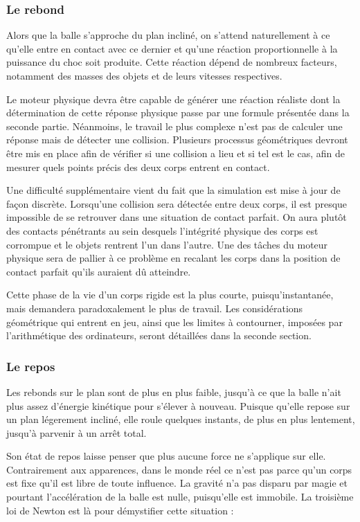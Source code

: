 \subsubsection{Le rebond}

Alors que la balle s'approche du plan incliné, on s'attend naturellement à ce qu'elle entre en contact avec ce dernier et qu'une réaction proportionnelle à la puissance du choc soit produite. Cette réaction dépend de nombreux facteurs, notamment des masses des objets et de leurs vitesses respectives.

Le moteur physique devra être capable de générer une réaction réaliste dont la détermination de cette réponse physique passe par une formule présentée dans la seconde partie. Néanmoins, le travail le plus complexe n'est pas de calculer une réponse mais de détecter une collision. Plusieurs processus géométriques devront être mis en place afin de vérifier si une collision a lieu et si tel est le cas, afin de mesurer quels points précis des deux corps entrent en contact.

Une difficulté supplémentaire vient du fait que la simulation est mise à jour de façon discrète. Lorsqu'une collision sera détectée entre deux corps, il est presque impossible de se retrouver dans une situation de contact parfait. On aura plutôt des contacts pénétrants au sein desquels l'intégrité physique des corps est corrompue et le objets rentrent l'un dans l'autre. Une des tâches du moteur physique sera de pallier à ce problème en recalant les corps dans la position de contact parfait qu'ils auraient dû atteindre.

Cette phase de la vie d'un corps rigide est la plus courte, puisqu'instantanée, mais demandera paradoxalement le plus de travail. Les considérations géométrique qui entrent en jeu, ainsi que les limites à contourner, imposées par l'arithmétique des ordinateurs, seront détaillées dans la seconde section.

\subsubsection{Le repos}

Les rebonds sur le plan sont de plus en plus faible, jusqu'à ce que la balle n'ait plus assez d'énergie kinétique pour s'élever à nouveau. Puisque qu'elle repose sur un plan légerement incliné, elle roule quelques instants, de plus en plus lentement, jusqu'à parvenir à un arrêt total.

Son état de repos laisse penser que plus aucune force ne s'applique sur elle. Contrairement aux apparences, dans le monde réel ce n'est pas parce qu'un corps est fixe qu'il est libre de toute influence. La gravité n'a pas disparu par magie et pourtant l'accélération de la balle est nulle, puisqu'elle est immobile. La troisième loi de Newton est là pour démystifier cette situation :

